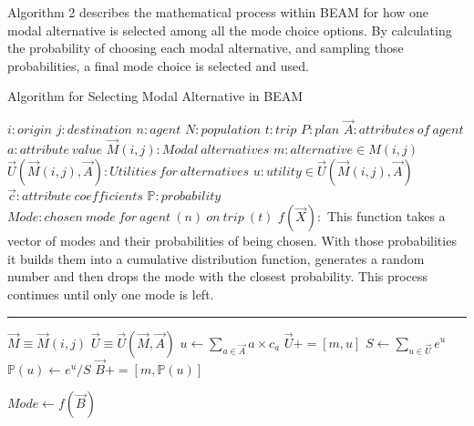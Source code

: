 \documentclass[fancy, masters]{byuthesis}
\begin{document}
Algorithm 2 describes the mathematical process within BEAM for how one modal alternative is selected among all the mode choice options. By calculating the probability of choosing each modal alternative, and sampling those probabilities, a final mode choice is selected and used.

\begin{algorithm}
\caption{Algorithm for Selecting Modal Alternative in BEAM}
\begin{algorithmic}[1]
\Require
\State $i : origin$
\State $j : destination$
\State $n: agent$
\State $N: population$
\State $t : trip $
\State $P : plan$
\State $\vec{A}: attributes\:of\:agent$
\State $a: attribute\:value$
\State $\vec{M}(i,j) : Modal\:alternatives$
\State $m : alternative \in M(i,j)$
\State $\vec{U}(\vec{M}(i,j),\vec{A}):Utilities\:for\:alternatives$
\State $u: utility \in \vec{U}(\vec{M}(i,j),\vec{A})$
\State $\vec{c}: attribute\:coefficients$
\State $\mathds{P}: probability$
\State $Mode: chosen\:mode\:for\:agent\:(n)\:on\:trip\:(t)$
\State $f(\vec{X}):$
This function takes a vector of modes and  their probabilities of being chosen. With those probabilities it builds them into a cumulative distribution function, generates a random number and then drops the mode with the closest probability. This process continues until only one mode is left.
\vspace{4pt}\hrule\vspace{5pt}

\State $\vec{M} \equiv \vec{M}(i,j)$
\State $\vec{U} \equiv \vec{U}(\vec{M},\vec{A})$
  \State $u \gets \sum_{a\in \vec{A}} a \times c_a$
  \State $\vec{U} += [m,u]$
\EndFor
\State $S \gets \sum_{u\in \vec{U}}e^u$
    \State $\mathds{P}(u)\gets e^u / S$
    \State $\vec{B} +=[m, \mathds{P}(u)]$
\EndFor 

\State $Mode \gets f(\vec{B})$

\EndProcedure

\EndFor
\EndFor
\Statex
\end{algorithmic}
\end{algorithm}

%
\end{document}
